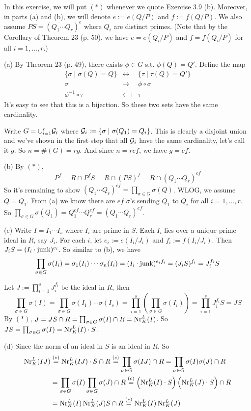 \documentclass[../Marcus.tex]{subfiles}
\begin{document}
In this exercise, we will put $(*)$ whenever we quote Exercise 3.9 (b). Moreover, in parts (a) and (b), we will denote $e:=e(Q/P)$ and $f:=f(Q/P)$. We also assume $PS=(Q_1\cdots Q_r)^e$ where $Q_i$ are distinct primes. (Note that by the Corollary of Theorem 23 (p. 50), we have $e=e(Q_i/P)$ and $f=f(Q_i/P)$ for all $i=1,\ldots,r$.)

(a) By Theorem 23 (p. 49), there exists $\phi\in G$ s.t. $\phi(Q)=Q'$. Define the map
$$
\begin{array}{ccc}
    \{\sigma\mid \sigma(Q)=Q\} & \longleftrightarrow & \{\tau\mid \tau(Q)=Q'\} \\
    \sigma & \longmapsto & \phi\circ\sigma \\
    \phi^{-1}\circ\tau & \longmapsfrom & \tau
    \end{array}
$$
It's easy to see that this is a bijection. So these two sets have the same cardinality.

Write $G=\cup_{i=1}^r \mathcal{G}_i$ where $\mathcal{G}_i:=\{\sigma\mid \sigma(Q_1)=Q_i\}$. This is clearly a disjoint union and we've shown in the first step that all $\mathcal{G}_i$ have the same cardinality, let's call it $g$. So $n=\#(G)=rg$. And since $n=ref$, we have $g=ef$.

(b) By $(*)$,
$$
P^f=R\cap P^fS=R\cap(PS)^f=R\cap(Q_1\cdots Q_r)^{ef}
$$
So it's remaining to show $(Q_1\cdots Q_r)^{ef}=\prod_{\sigma\in G}\sigma(Q)$. WLOG, we assume $Q=Q_1$. From (a) we know there are $ef$ $\sigma$'s sending $Q_1$ to $Q_i$ for all $i=1,\ldots,r$. So $\prod_{\sigma\in G}\sigma(Q_1)=Q_1^{ef}\cdots Q_r^{ef}=(Q_1\cdots Q_r)^{ef}$.

(c) Write $I=I_1\cdots I_s$ where $I_i$ are prime in $S$. Each $I_i$ lies over a unique prime ideal in $R$, say $J_i$. For each $i$, let $e_i:=e(I_i/J_i)$ and $f_i:=f(I_i/J_i)$. Then $J_iS=(I_i\cdot\operatorname{junk})^{e_i}$. So similar to (b), we have 
$$
\prod_{\sigma\in G}\sigma(I_i)
= \sigma_1(I_i)\cdots\sigma_n(I_i)
= (I_i\cdot\operatorname{junk})^{e_if_i}
= (J_iS)^{f_i}=J_i^{f_i}S
$$

Let $J:=\prod_{i=1}^s J_i^{f_i}$ be the ideal in $R$, then
$$
\prod_{\sigma\in G}\sigma(I)
= \prod_{\sigma\in G}\sigma(I_1)\cdots\sigma(I_s)
= \prod_{i=1}^s\left(\prod_{\sigma\in G}\sigma(I_i)\right)
= \prod_{i=1}^s J_i^{f_i}S=JS
$$
By $(*)$, $J=JS\cap R=\prod_{\sigma\in G}\sigma(I)\cap R=\operatorname{Nr}^L_K(I)$. So $JS=\prod_{\sigma\in G}\sigma(I)=\operatorname{Nr}^L_K(I)\cdot S$.

(d) Since the norm of an ideal in $S$ is an ideal in $R$. So
\begin{align*}
    \operatorname{Nr}^L_K(IJ)
	&\overset{(*)}{=} \operatorname{Nr}^L_K(IJ)\cdot S\cap R
	\overset{(c)}{=} \prod_{\sigma\in G}\sigma(IJ)\cap R
	= \prod_{\sigma\in G}\sigma(I)\sigma(J)\cap R   \\
    &= \prod_{\sigma\in G}\sigma(I)\prod_{\sigma\in G}\sigma(J)\cap R
	\overset{(c)}{=} \left(\operatorname{Nr}^L_K(I)\cdot S\right)\left(\operatorname{Nr}^L_K(J)\cdot S\right)\cap R   \\
    &= \operatorname{Nr}^L_K(I)\operatorname{Nr}^L_K(J)S\cap R
	\overset{(*)}{=} \operatorname{Nr}^L_K(I)\operatorname{Nr}^L_K(J)
\end{align*}
\end{document}
